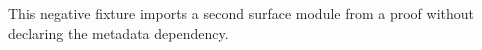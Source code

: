 This negative fixture imports a second surface module from a proof without declaring the metadata dependency.
